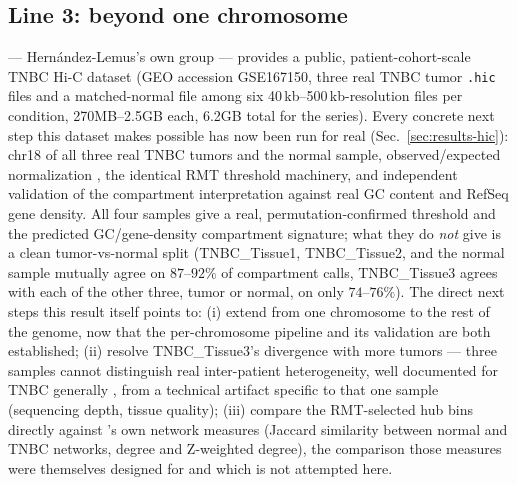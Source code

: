 \documentclass[11pt]{article}
\begin{document}
\subsection{Line 3: beyond one chromosome}
\citet{reyesgopar2025} --- Hern\'andez-Lemus's own group --- provides a
public, patient-cohort-scale TNBC Hi-C dataset (GEO accession
GSE167150, three real TNBC tumor \texttt{.hic} files and a
matched-normal file among six 40\,kb--500\,kb-resolution files per
condition, 270MB--2.5GB each, 6.2GB total for the series). Every
concrete next step this dataset makes possible has now been run for
real (Sec.~\ref{sec:results-hic}): chr18 of all three real TNBC
tumors and the normal sample, observed/expected normalization
\citep{liebermanaiden2009}, the identical RMT threshold machinery, and
independent validation of the compartment interpretation against real
GC content and RefSeq gene density. All four samples give a real,
permutation-confirmed threshold and the predicted GC/gene-density
compartment signature; what they do \emph{not} give is a clean
tumor-vs-normal split (TNBC\_Tissue1, TNBC\_Tissue2, and the normal
sample mutually agree on $87$--$92\%$ of compartment calls,
TNBC\_Tissue3 agrees with each of the other three, tumor or normal, on
only $74$--$76\%$). The direct next steps this result itself points to:
(i) extend from one chromosome to the rest of the genome, now that the
per-chromosome pipeline and its validation are both established; (ii)
resolve TNBC\_Tissue3's divergence with more tumors --- three samples
cannot distinguish real inter-patient heterogeneity, well documented
for TNBC generally \citep{foulkes2010}, from a technical artifact
specific to that one sample (sequencing depth, tissue quality); (iii)
compare the RMT-selected hub bins directly against
\citet{reyesgopar2025}'s own network measures (Jaccard similarity
between normal and TNBC networks, degree and Z-weighted degree), the
comparison those measures were themselves designed for and which is
not attempted here.
\end{document}
